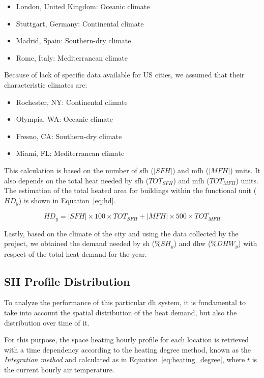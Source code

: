 \documentclass{article}
\begin{document}
\begin{itemize}
    \item London, United Kingdom: Oceanic climate
    \item Stuttgart, Germany: Continental climate
    \item Madrid, Spain: Southern-dry climate
    \item Rome, Italy: Mediterranean climate
\end{itemize}

Because of lack of specific data available for US cities, we assumed that their characteristic climates are:

\begin{itemize}
    \item Rochester, NY: Continental climate
    \item Olympia, WA: Oceanic climate
    \item Fresno, CA: Southern-dry climate
    \item Miami, FL: Mediterranean climate
\end{itemize}

This calculation is based on the number of \gls{sfh} ($|SFH|$) and \gls{mfh} ($|MFH|$) units. It also depends on the total heat needed by \gls{sfh} ($TOT_{SFH}$) and \gls{mfh} ($TOT_{MFH}$) units. The estimation of the total heated area for buildings within the functional unit ($HD_y$) is shown in Equation~\ref{eq:hd}.

\begin{equation}
\label{eq:hd}
    HD_y = |SFH| \times 100 \times TOT_{SFH} + |MFH| \times 500 \times TOT_{MFH}
\end{equation}

Lastly, based on the climate of the city and using the data collected by the \inspire project, we obtained the demand needed by \gls{sh} ($\%SH_y$) and \gls{dhw} ($\%DHW_y$) with respect of the total heat demand for the year.

\subsection{SH Profile Distribution}

To analyze the performance of this particular \gls{dh} system, it is fundamental to take into account the spatial distribution of the heat demand, but also the distribution over time of it.

For this purpose, the space heating hourly profile for each location is retrieved with a time dependency according to the heating degree method, known as the \emph{Integration method} \cite{deg_days} and calculated as in Equation~\ref{eq:heating_degree}, where $t$ is the current hourly air temperature. 
\end{document}
